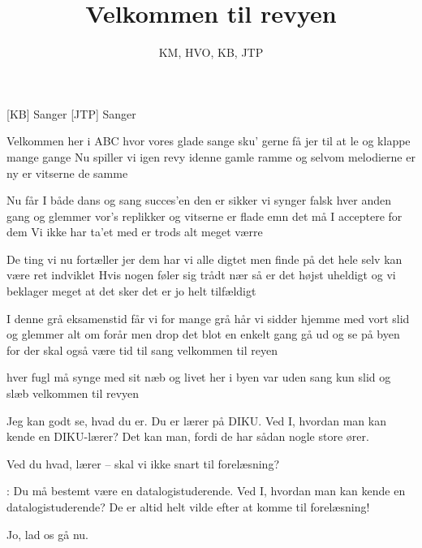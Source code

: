 \documentclass[a4paper,11pt]{article}
\title{Velkommen til revyen}
\author{KM, HVO, KB, JTP}
\begin{document}
\maketitle

\begin{roles}
[KB] Sanger
[JTP] Sanger

\end{roles}


\begin{song}
%
Velkommen her i ABC hvor vores glade sange
sku' gerne få jer til at le og klappe mange gange
Nu spiller vi igen revy idenne gamle ramme
og selvom melodierne er ny er vitserne de samme

Nu får I både dans og sang succes'en den er sikker
vi synger falsk hver anden gang og glemmer vor's replikker
og vitserne er flade emn det må I acceptere
for dem Vi ikke har ta'et med er trods alt meget værre

De ting vi nu fortæller jer dem har vi alle digtet
men finde på det hele selv kan være ret indviklet
Hvis nogen føler sig trådt nær så er det højst uheldigt
og vi beklager meget at det sker det er jo helt tilfældigt

I denne grå eksamenstid får vi for mange grå hår
vi sidder hjemme med vort slid og glemmer alt om forår
men drop det blot en enkelt gang gå ud og se på byen
for der skal også være tid til sang velkommen til reyen

hver fugl må synge med sit næb og livet her i byen
var uden sang kun slid og slæb velkommen til revyen
\end{song}

\begin{sketch}
 Jeg kan godt se, hvad du er. Du er lærer på
DIKU.  Ved I, hvordan man kan kende en DIKU-lærer?  Det
kan man, fordi de har sådan nogle store ører.

Ved du hvad, lærer -- skal vi ikke snart til forelæsning?

: Du må bestemt være en datalogistuderende.  Ved
I, hvordan man kan kende en datalogistuderende?  De er altid helt
vilde efter at komme til forelæsning!

Jo, lad os gå nu.
\end{sketch}
\end{document}
